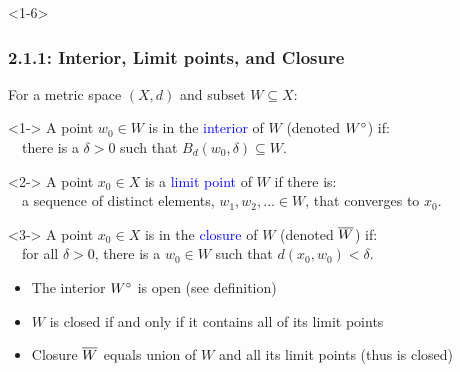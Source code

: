 \documentclass[10pt,english,aspectratio=169]{beamer}
\begin{document}
\begin{frame}<1-6> \frametitle{2.1.1: Interior, Limit points, and Closure}

For a metric space $(X,d)$ and subset $W \subseteq X$:

\begin{definition}<1->
A point $w_0 \in W$ is in the \textcolor{blue}{interior} of $W$ (denoted ${W}^{\circ}$) if: \\ ~~there is a $\delta >0$ such that $B_d (w_0,\delta) \subseteq W$. %
\end{definition}

\begin{definition}<2->
A point $x_0 \in X$ is a \textcolor{blue}{limit point} of $W$ if there is: \\  ~~a sequence of distinct elements, $w_1,w_2,\ldots\in W$, that converges to $x_0$.
\end{definition}

\begin{definition}<3->
A point $x_0\in X$ is in the \textcolor{blue}{closure} of $W$ (denoted $\overline{W}$) if: \\ ~~for all $\delta >0$, there is a $w_0\in W$ such that $d(x_0,w_0)<\delta$.
\end{definition}

\begin{itemize}
  \setlength\itemsep{1.5mm}
  \item<4-> The interior ${W}^{\circ}$ is open (see definition)
  \item<5-> $W$ is closed if and only if it contains all of its limit points
  \item<6-> Closure $\overline{W}$ equals union of $W$ and all its limit points (thus is closed)
\end{itemize}


\end{frame}
\end{document}

